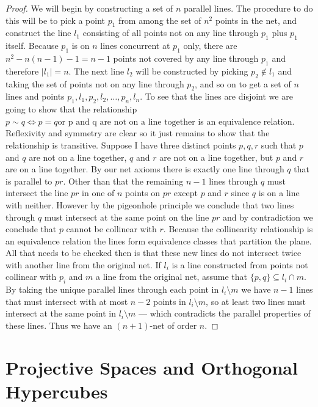 \documentclass{article}
\begin{document}
\begin{proof}
  We will begin by constructing a set of \(n\) parallel lines. 
  The procedure to do this will be to pick a point \(p_{1}\) from among the set of \(n^{2}\) points in the net, and construct the line \(l_{1}\) consisting of all points not on any line through \(p_{1}\) plus \(p_{1}\) itself. Because \(p_{1}\) is on \(n\) lines concurrent at \(p_{1}\) only, there are \(n^{2} - n(n - 1) - 1 = n - 1\) points not covered by any line through \(p_{1}\) and therefore \(|l_{1}| = n\). The next line \(l_{2}\) will be constructed by picking \(p_{2} \notin l_{1}\) and taking the set of points not on any line through \(p_{2}\), and so on to get a set of \(n\) lines and points \(p_{1}, l_{1}, p_{2}, l_{2}, \ldots, p_{n}, l_{n}\). To see that the lines are disjoint we are going to show that the relationship \(p \sim q \iff p = q \text{or p and q are not on a line together}\) is an equivalence relation. Reflexivity and symmetry are clear so it just remains to show that the relationship is transitive. Suppose I have three distinct points \(p, q, r\) such that \(p\) and \(q\) are not on a line together, \(q\) and \(r\) are not on a line together, but \(p\) and \(r\) are on a line together.
  By our net axioms there is exactly one line through \(q\) that is parallel to \(pr\). Other than that the remaining \(n - 1\) lines through \(q\) must intersect the line \(pr\) in one of \(n\) points on \(pr\) except \(p\) and \(r\) since \(q\) is on a line with neither. However by the pigeonhole principle we conclude that two lines through \(q\) must intersect at the same point on the line \(pr\) and by contradiction we conclude that \(p\) cannot be collinear with \(r\). Because the collinearity relationship is an equivalence relation the lines form equivalence classes that partition the plane. All that needs to be checked then is that these new lines do not intersect twice with another line from the original net. If \(l_{i}\) is a line constructed from points not collinear with \(p_{i}\) and \(m\) a line from the original net, assume that \(\{p, q\} \subseteq l_{i} \cap m\). By taking the unique parallel lines through each point in \(l_{i} \setminus m\) we have \(n - 1\) lines that must intersect with at most \(n - 2\) points in \(l_{i} \setminus m\), so at least two lines must intersect at the same point in \(l_{i} \setminus m\) --- which contradicts the parallel properties of these lines. Thus we have an \((n + 1)\)-net of order \(n\).
\end{proof}
    \section{Projective Spaces and Orthogonal Hypercubes}
    
\end{document}
